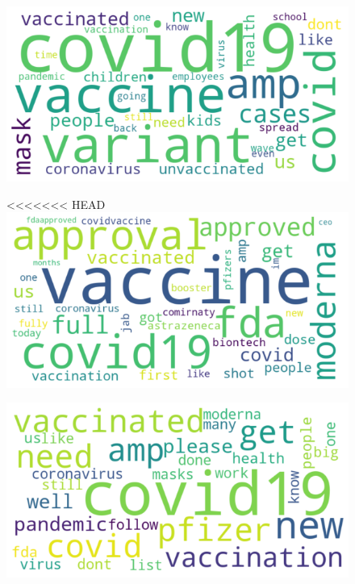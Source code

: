 \documentclass[12pt,%
               a4paper,%
               oneside,openany,%
               titlepage,%
               headinclude,footinclude,%
               BCOR5mm,%
               cleardoublepage=empty,%
               tablecaptionabove,%
               floatperchapter,
               ]{scrreprt}                 %
\begin{document}
\begin{figure}[ht]
\begin{minipage}[b]{0.5\linewidth}
    \vspace{4ex}
  \end{minipage}
  \begin{minipage}[b]{0.5\linewidth}
    \centering
    \includegraphics[width=.9\linewidth]{Figures/WordCloud_delta.png}
    \vspace{4ex}
  \end{minipage}
  \begin{minipage}[b]{0.5\linewidth}
    \centering
<<<<<<< HEAD
    \includegraphics[width=.9\linewidth]{Figures/WordCloud_pfizer.png}
    \vspace{4ex}
  \end{minipage}
  \begin{minipage}[b]{0.5\linewidth}
    \centering
    \includegraphics[width=.9\linewidth]{Figures/WordCloud_Vaccine.png}

\end{minipage}
\end{figure}
\end{document}

